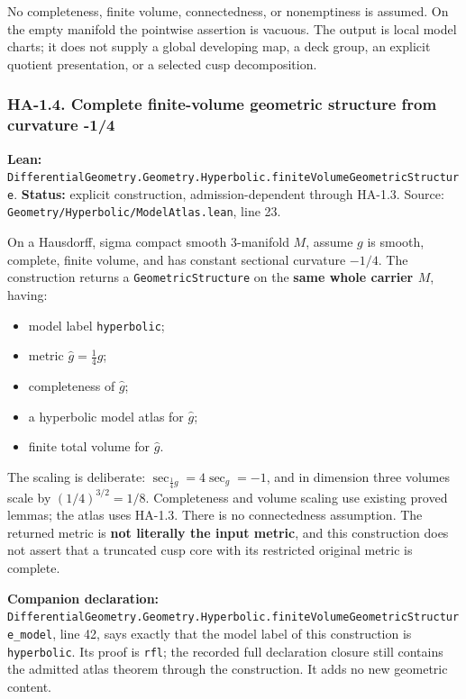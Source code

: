 \documentclass[
  letterpaper,
  11pt]{article}
\providecommand{\tightlist}{%
  \setlength{\itemsep}{0pt}\setlength{\parskip}{0pt}}
\begin{document}
No completeness, finite volume, connectedness, or nonemptiness is
assumed. On the empty manifold the pointwise assertion is vacuous. The
output is local model charts; it does not supply a global developing
map, a deck group, an explicit quotient presentation, or a selected cusp
decomposition.

\subsubsection{HA-1.4. Complete finite-volume geometric structure from
curvature -1/4}\label{ha-1-4}

\textbf{Lean:}
{\small\texttt{Differential\allowbreak{}Geometry.\allowbreak{}Geometry.\allowbreak{}Hyperbolic.\allowbreak{}finite\allowbreak{}Volume\allowbreak{}Geometric\allowbreak{}Structure}}.
\textbf{Status:} explicit construction, admission-dependent through
HA-1.3. Source:
{\small\texttt{Geometry/\allowbreak{}Hyperbolic/\allowbreak{}Model\allowbreak{}Atlas.\allowbreak{}lean}},
line 23.

On a Hausdorff, sigma compact smooth 3-manifold \(M\), assume \(g\) is
smooth, complete, finite volume, and has constant sectional curvature
\(-1/4\). The construction returns a
{\small\texttt{Geometric\allowbreak{}Structure}} on the \textbf{same
whole carrier \(M\)}, having:

\begin{itemize}
\tightlist
\item
  model label {\small\texttt{hyperbolic}};
\item
  metric \(\widehat g=\tfrac14g\);
\item
  completeness of \(\widehat g\);
\item
  a hyperbolic model atlas for \(\widehat g\);
\item
  finite total volume for \(\widehat g\).
\end{itemize}

The scaling is deliberate: \(\sec_{\frac14g}=4\sec_g=-1\), and in
dimension three volumes scale by \((1/4)^{3/2}=1/8\). Completeness and
volume scaling use existing proved lemmas; the atlas uses HA-1.3. There
is no connectedness assumption. The returned metric is \textbf{not
literally the input metric}, and this construction does not assert that
a truncated cusp core with its restricted original metric is complete.

\textbf{Companion declaration:}
{\small\texttt{Differential\allowbreak{}Geometry.\allowbreak{}Geometry.\allowbreak{}Hyperbolic.\allowbreak{}finite\allowbreak{}Volume\allowbreak{}Geometric\allowbreak{}Structure\_\allowbreak{}model}},
line 42, says exactly that the model label of this construction is
{\small\texttt{hyperbolic}}. Its proof is {\small\texttt{rfl}}; the
recorded full declaration closure still contains the admitted atlas
theorem through the construction. It adds no new geometric content.
\end{document}
